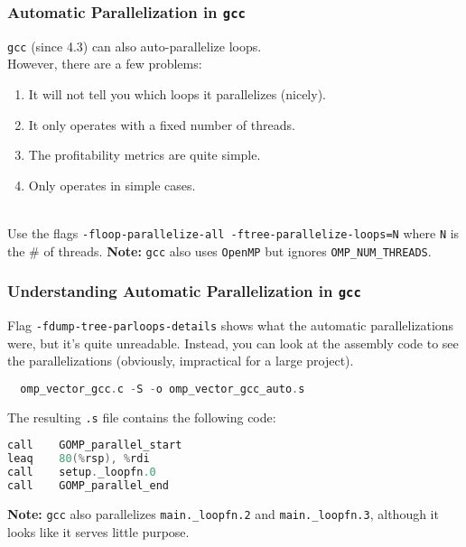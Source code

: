 \begin{frame}[fragile]
  \frametitle{Automatic Parallelization in {\tt gcc}}


  {\tt gcc} (since 4.3) can also auto-parallelize loops. \\
  However, there are
      a few problems:
      \begin{enumerate}
        \item It will not tell you which loops it parallelizes (nicely).
        \item It only operates with a fixed number of threads.
        \item The profitability metrics are quite simple.
        \item Only operates in simple cases.
      \end{enumerate}
   ~\\[1em]

  Use the flags {\tt -floop-parallelize-all -ftree-parallelize-loops=N} where {\tt N} is the \# of
  threads.
  \vfill
  {\bf Note:} {\tt gcc} also uses {\tt OpenMP} but ignores
  {\tt OMP\_NUM\_THREADS}.


\end{frame}

\begin{frame}[fragile]
  \frametitle{Understanding Automatic Parallelization in {\tt gcc}}


  Flag {\tt -fdump-tree-parloops-details} shows what the automatic
  parallelizations were, but it's quite unreadable.
  \vfill
  Instead, you can look at the assembly code to see the parallelizations
  (obviously, impractical for a large project).
  \begin{lstlisting}[language=C]
% gcc -std=c99 -O3 -ftree-parallelize-loops=4
  omp_vector_gcc.c -S -o omp_vector_gcc_auto.s
  \end{lstlisting}
  \vfill
  The resulting {\tt .s} file contains the following code:
  \begin{lstlisting}[language=C]
call    GOMP_parallel_start
leaq    80(%rsp), %rdi
call    setup._loopfn.0
call    GOMP_parallel_end
  \end{lstlisting}
  \vfill
  {\bf Note:} {\tt gcc} also parallelizes {\tt main.\_loopfn.2} and
  {\tt main.\_loopfn.3}, although it looks like it serves little purpose.


\end{frame}


